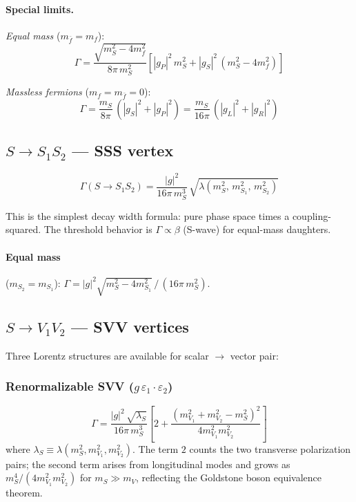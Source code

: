 \documentclass[11pt,a4paper]{article}
\newcommand{\la}{\lambda}
\newcommand{\beq}{\begin{equation}}
\newcommand{\eeq}{\end{equation}}
\begin{document}
\paragraph{Special limits.}

\noindent\textit{Equal mass} ($m_{\bar f} = m_f$):
\beq
\Gamma = \frac{\sqrt{m_S^2-4m_f^2}}{8\pi\, m_S^2}
\left[|g_P|^2\, m_S^2 + |g_S|^2\,(m_S^2-4m_f^2)\right]
\label{eq:S-ff-va-equal}
\eeq

\noindent\textit{Massless fermions} ($m_f = m_{\bar f} = 0$):
\beq
\Gamma = \frac{m_S}{8\pi}\,(|g_S|^2+|g_P|^2)
= \frac{m_S}{16\pi}\,(|g_L|^2+|g_R|^2)
\label{eq:S-ff-massless}
\eeq

\subsection{$S \to S_1 S_2$ --- SSS vertex}
\label{sec:SSS}

\beq
\boxed{
\Gamma(S\to S_1 S_2) = \frac{|g|^2}{16\pi\, m_S^3}\,
\sqrt{\la(m_S^2,\, m_{S_1}^2,\, m_{S_2}^2)}
}
\label{eq:SSS}
\eeq

This is the simplest decay width formula: pure phase space times a coupling-squared.
The threshold behavior is $\Gamma \propto \beta$ (S-wave) for equal-mass daughters.

\paragraph{Equal mass} ($m_{S_2} = m_{S_1}$):
$\Gamma = |g|^2 \sqrt{m_S^2 - 4m_{S_1}^2}\,/\,(16\pi\, m_S^2)$.

\subsection{$S \to V_1 V_2$ --- SVV vertices}
\label{sec:SVV}

Three Lorentz structures are available for scalar $\to$ vector pair:

\subsubsection{Renormalizable SVV ($g\,\varepsilon_1\cdot\varepsilon_2$)}
\beq
\boxed{
\Gamma = \frac{|g|^2\,\sqrt{\la_S}}{16\pi\, m_S^3}
\left[2 + \frac{(m_{V_1}^2+m_{V_2}^2-m_S^2)^2}{4m_{V_1}^2 m_{V_2}^2}\right]
}
\label{eq:SVV}
\eeq
where $\la_S \equiv \la(m_S^2, m_{V_1}^2, m_{V_2}^2)$.
The term $2$ counts the two transverse polarization pairs; the second term arises from
longitudinal modes and grows as $m_S^4/(4m_{V_1}^2 m_{V_2}^2)$ for $m_S \gg m_V$,
reflecting the Goldstone boson equivalence theorem.
\end{document}
